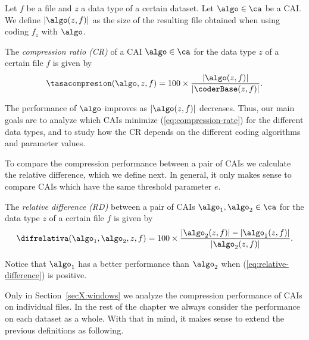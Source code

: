 \vspace{+2pt}
\begin{defcion}
Let $f$ be a file and $z$ a data type of a certain dataset. Let $\algo \in \ca$ be a CAI. We define $|\algo(z, f)|$ as the size of the resulting file obtained when using coding $f_z$ with $\algo$.
\end{defcion}


\vspace{+2pt}
\begin{defcion}
The \textit{compression ratio (CR)} of a CAI $\algo \in \ca$ for the data type $z$ of a certain file $f$ is given by
\vspace{-5pt}
\begin{equation}
\label{eq:compression-rate}
\tasacompresion(\algo, z, f) = 100\times\frac{|\algo(z, f)|}{|\coderBase(z, f)|}.
\end{equation}
\end{defcion}


The performance of $\algo$ improves as $|\algo(z, f)|$ decreases. Thus, our main goals are to analyze which CAIs minimize (\ref{eq:compression-rate}) for the different data types, and to study how the CR depends on the different coding algorithms and parameter values.


To compare the compression performance between a pair of CAIs we calculate the relative difference, which we define next. In general, it only makes sense to compare CAIs which have the same threshold parameter $e$.


\vspace{+5pt}
\begin{defcion}
The \textit{relative difference (RD)} between a pair of CAIs $\algo_1, \algo_2 \in {\ca}$ for the data type $z$ of a certain file $f$ is given by
\vspace{-5pt}
\begin{equation}
\label{eq:relative-difference}
\difrelativa(\algo_1, \algo_2, z, f)  =
100\times\frac{|\algo_2 (z, f)| - |\algo_1 (z, f)|}{ |\algo_2 (z, f)| }.
\end{equation}
\end{defcion}


Notice that $\algo_1$ has a better performance than $\algo_2$ when (\ref{eq:relative-difference}) is positive.


\vspace{+3pt}
Only in Section~\ref{secX:windows} we analyze the compression performance of CAIs on individual files. In the rest of the chapter we always consider the performance on each dataset as a whole. With that in mind, it makes sense to extend the previous definitions as following.


